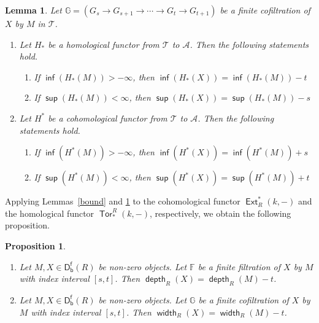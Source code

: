 \documentclass[10pt, a4paper,reqno]{amsart}
\newtheorem{lem}[lem]{Lemma}
\newtheorem{prop}[prop]{Proposition}
\theoremstyle{definition}
\theoremstyle{remark}
\numberwithin{equation}{thm}
\def\FF{\mathbb{F}}
\def\GG{\mathbb{G}}
\def\cA{\mathcal{A}}
\def\cT{\mathcal{T}}
\def\depth{\operatorname{\mathsf{depth}}}
\def\width{\operatorname{\mathsf{width}}}
\def\Ext{\operatorname{\mathsf{Ext}}}
\def\Tor{\operatorname{\mathsf{Tor}}}
\def\Dfb{\mathsf{D^f_b}}
\def\sup{\operatorname{\mathsf{sup}}}
\def\inf{\operatorname{\mathsf{inf}}}
\begin{document}
\begin{lem}\label{bound2}
Let $\GG = (G_{s} \to G_{s+1} \to \cdots \to G_{t} \to G_{t+1})$ be a finite cofiltration of $X$ by $M$ in $\cT$.
\begin{enumerate}[\rm(1)]
\item	
Let $H_*$ be a homological functor from $\cT$ to $\cA$.
Then the following statements hold.
\begin{enumerate}[\rm(i)]
\item
If $\inf(H_*(M))> -\infty$, then $\inf(H_*(X)) = \inf(H_*(M)) - t$
\item
If $\sup(H_*(M))< \infty$, then $\sup(H_*(X)) = \sup(H_*(M)) - s$
\end{enumerate}

\item	
Let $H^*$ be a cohomological functor from $\cT$ to $\cA$.
Then the following statements hold.
\begin{enumerate}[\rm(i)]
\item
If $\inf(H^*(M))> -\infty$, then $\inf(H^*(X)) = \inf(H^*(M)) + s$
\item
If $\sup(H^*(M))< \infty$, then $\sup(H^*(X)) = \sup(H^*(M)) + t$
\end{enumerate}
\end{enumerate}
\end{lem}

Applying Lemmas~\ref{bound} and \ref{bound2} to the cohomological functor $\Ext^*_R(k,-)$ and the homological functor $\Tor_*^R(k,-)$, respectively, we obtain the following proposition.

\begin{prop}\label{dwlem}
\begin{enumerate}[\rm(1)]
\item
Let $M, X \in \Dfb(R)$ be non-zero objects.
Let $\FF$ be a finite filtration of $X$ by $M$ with index interval $[s,t]$.
Then $\depth_R(X) = \depth_R(M) - t$.

\item
Let $M, X \in \Dfb(R)$ be non-zero objects.
Let $\GG$ be a finite cofiltration of $X$ by $M$ with index interval $[s,t]$.
Then $\width_R(X) = \width_R(M) - t$.
\end{enumerate}	
\end{prop}



\end{document}

